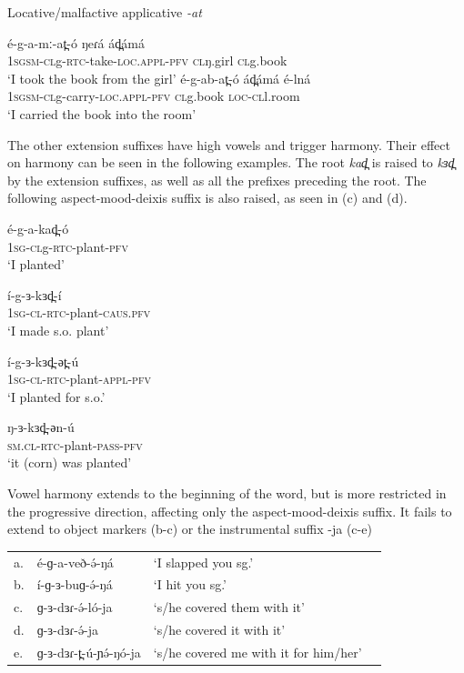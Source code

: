 \ea Locative/malfactive applicative \textit{-at}
\begin{xlist}
	\ex \gll é-g-a-mː-at̪-ó 	ŋeɾá 	ád̪ámá 	\\
		1\textsc{sgsm-cl}g-\textsc{rtc}-take-\textsc{loc.appl}-\textsc{pfv}	\textsc{cl}ŋ.girl	\textsc{cl}g.book  \\
	 \trans ‘I took the book from the girl’
	\ex \gll é-g-ab-at̪-ó 	ád̪ámá 	é-lná \\
		1\textsc{sgsm-cl}g-carry-\textsc{loc.appl}-\textsc{pfv}	\textsc{cl}g.book  	\textsc{loc-cl}l.room\\
	\trans ‘I carried the book into the room’
\end{xlist}
\z

The other extension suffixes have high vowels and trigger harmony. Their effect on harmony can be seen in the following examples. The root \textit{kad̪} is raised to \textit{kɜd̪} by the extension suffixes, as well as all the prefixes preceding the root. The following aspect-mood-deixis suffix is also raised, as seen in (c) and (d). 

\ea
\begin{xlist}
\ex \gll	é-g-a-kad̪-ó\\  			
 	1\textsc{sg-cl}g-\textsc{rtc}-plant-\textsc{pfv}\\  			
 	\trans ‘I planted’ 					

\ex \gll 	í-g-ɜ-kɜd̪-í\\
	1\textsc{sg-cl}-\textsc{rtc}-plant-\textsc{caus}.\textsc{pfv}\\
	\trans ‘I made s.o. plant’

\ex \gll	í-g-ɜ-kɜd̪-әt̪-ú \\ 				
 	1\textsc{sg-cl}-\textsc{rtc}-plant-\textsc{appl}-\textsc{pfv} \\
 	\trans ‘I planted for s.o.’ 

\ex \gll 	ŋ-ɜ-kɜd̪-әn-ú\\
	\textsc{sm.cl}-\textsc{rtc}-plant-\textsc{pass}-\textsc{pfv}\\
	\trans ‘it (corn) was planted’
\end{xlist}
\z

Vowel harmony extends to the beginning of the word, but is more restricted in the progressive direction, affecting only the aspect-mood-deixis suffix. It fails to extend to object markers (b-c) or the instrumental suffix -ja (c-e)

\ea
\begin{tabular}[t]{llll}
a.&	é-ɡ-a-veð-ə́-ŋá		&	‘I slapped you sg.’	 \\
b.&	í-ɡ-ɜ-buɡ-ə́-ŋá		&	‘I hit you sg.’		 \\
c.&	ɡ-ɜ-dɜɾ-ə́-ló-ja		&	‘s/he covered them with it’\\
d.&	ɡ-ɜ-dɜɾ-ə́-ja			&	‘s/he covered it with it’\\
e.&	ɡ-ɜ-dɜɾ-t̪-ú-ɲə́-ŋó-ja	&	‘s/he covered me with it for him/her’\\
\end{tabular}
\z

